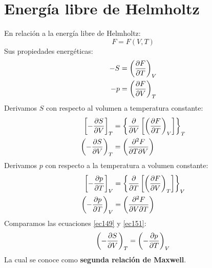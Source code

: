 \documentclass[../main]{subfiles}
\begin{document}
\section{Energía libre de Helmholtz}
En relación a la energía libre de Helmholtz:
\begin{equation}
    F=F(V,T)
\end{equation}
Sus propiedades energéticas:
\begin{align}
    -S&=\left( \pdv{F}{T} \right)_V \\
    -p&=\left( \pdv{F}{V}\right)_T
\end{align}
Derivamos $S$ con respecto al volumen a temperatura constante:
\begin{align}
    \left[- \pdv{S}{V}\right]_T&=\left\{ \pdv{}{V}\left[\left( \pdv{F}{T}\right)_V \right] \right\}_T \\
    \left( -\pdv{S}{V}\right)_T&=\left( \pdv{^2 F}{T \partial V}\right)
    \label{ec149}
\end{align}
Derivamos $p$ con respecto a la temperatura a volumen constante:
\begin{align}
    \left[- \pdv{p}{T}\right]_V&=\left\{ \pdv{}{T}\left[\left( \pdv{F}{V}\right)_T \right] \right\}_V \\
    \left( -\pdv{p}{T}\right)_V&=\left( \pdv{^2 F}{V \partial T}\right)
    \label{ec151}
\end{align}
Comparamos las ecuaciones \eqref{ec149} y \eqref{ec151}:
\begin{equation}
    \left( -\pdv{S}{V}\right)_T=\left( -\pdv{p}{T}\right)_V
\end{equation}
La cual se conoce como \textbf{segunda relación de Maxwell}.
\end{document}

